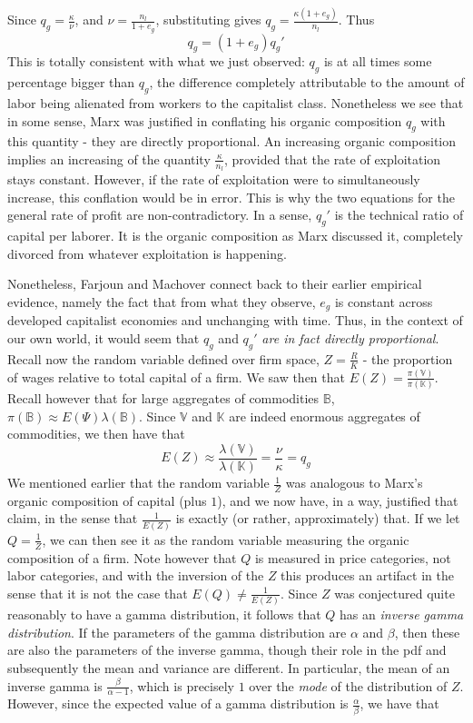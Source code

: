 \documentclass{article}
\theoremstyle{definition}
\theoremstyle{plain}
\theoremstyle{theorem}
\begin{document}
Since $q_g = \frac{\kappa}{\nu}$, and $\nu = \frac{n_l}{1+e_g}$, substituting gives $q_g = \frac{\kappa(1+e_g)}{n_l}$. Thus
\[ q_g = (1+e_g)q_g' \]
This is totally consistent with what we just observed: $q_g$ is at all times some percentage bigger than $q_g$, the difference completely attributable to the amount of labor being alienated from workers to the capitalist class. Nonetheless we see that in some sense, Marx was justified in conflating his organic composition $q_g$ with this quantity - they are directly proportional. An increasing organic composition implies an increasing of the quantity $\frac{\kappa}{n_l}$, provided that the rate of exploitation stays constant. However, if the rate of exploitation were to simultaneously increase, this conflation would be in error. This is why the two equations for the general rate of profit are non-contradictory. In a sense, $q_g'$ is the technical ratio of capital per laborer. It is the organic composition as Marx discussed it, completely divorced from whatever exploitation is happening. \par
Nonetheless, Farjoun and Machover connect back to their earlier empirical evidence, namely the fact that from what they observe, $e_g$ is constant across developed capitalist economies and unchanging with time. Thus, in the context of our own world, it would seem that $q_g$ and $q_g'$ \textit{are in fact directly proportional}. Recall now the random variable defined over firm space, $Z = \frac{R}{K}$ - the proportion of wages relative to total capital of a firm. We saw then that $E(Z) = \frac{\pi(\mathbb{V})}{\pi(\mathbb{K})}$. Recall however that for large aggregates of commodities $\mathbb{B}$, $\pi(\mathbb{B}) \approx E(\Psi)\lambda(\mathbb{B})$. Since $\mathbb{V}$ and $\mathbb{K}$ are indeed enormous aggregates of commodities, we then have that
\[ E(Z) \approx \frac{\lambda(\mathbb{V})}{\lambda(\mathbb{K})} = \frac{\nu}{\kappa} = q_g \]
We mentioned earlier that the random variable $\frac{1}{Z}$ was analogous to Marx's organic composition of capital (plus $1$), and we now have, in a way, justified that claim, in the sense that $\frac{1}{E(Z)}$ is exactly (or rather, approximately) that. If we let $Q = \frac{1}{Z}$, we can then see it as the random variable measuring the organic composition of a firm. Note however that $Q$ is measured in price categories, not labor categories, and with the inversion of the $Z$ this produces an artifact in the sense that it is not the case that $E(Q) \neq \frac{1}{E(Z)}$. Since $Z$ was conjectured quite reasonably to have a gamma distribution, it follows that $Q$ has an \textit{inverse gamma distribution}. If the parameters of the gamma distribution are $\alpha$ and $\beta$, then these are also the parameters of the inverse gamma, though their role in the pdf and subsequently the mean and variance are different. In particular, the mean of an inverse gamma is $\frac{\beta}{\alpha-1}$, which is precisely $1$ over the \textit{mode} of the distribution of $Z$. However, since the expected value of a gamma distribution is $\frac{\alpha}{\beta}$, we have that
\end{document}
